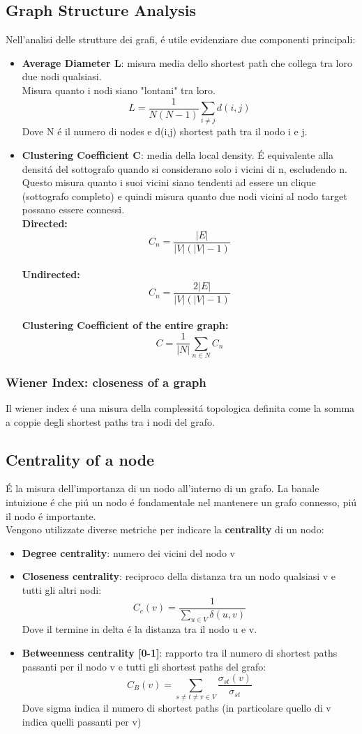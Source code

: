 \subsection{Graph Structure Analysis}
Nell'analisi delle strutture dei grafi, é utile evidenziare due componenti principali:
\begin{itemize}
    \item \textbf{Average Diameter L}: misura media dello shortest path che collega tra loro due nodi qualsiasi.
    \\
    Misura quanto i nodi siano "lontani" tra loro. 
    \[
    L =\frac{1}{N(N-1)} \sum_{i \neq j} d(i,j)
    \]
    Dove N é il numero di nodes e d(i,j) shortest path tra il nodo i e j.
    \item \textbf{Clustering Coefficient C}: media della local density.
    É equivalente alla densitá del sottografo quando si considerano solo i vicini di n, escludendo n. Questo misura quanto i suoi vicini siano tendenti ad essere un clique (sottografo completo) e quindi misura quanto due nodi vicini al nodo target possano essere connessi.
    \\[2ex]
    \textbf{Directed:}\[
    C_n = \frac{|E|}{|V|(|V|-1)}
    \]
    \\
    \textbf{Undirected:}\[
    C_n = \frac{2|E|}{|V|(|V|-1)}
    \]    
    \\
    \textbf{Clustering Coefficient of the entire graph:}
    \[
    C = \frac{1}{|N|}\sum_{n \in N}C_n
    \]
\end{itemize}

\subsubsection*{Wiener Index: closeness of a graph}
Il wiener index é una misura della complessitá topologica definita come la somma a coppie degli shortest paths tra i nodi del grafo. 
\newpage
\subsection{Centrality of a node}
É la misura dell'importanza di un nodo all'interno di un grafo. La banale intuizione é che piú un nodo é fondamentale nel mantenere un grafo connesso, piú il nodo é importante. 
\\
Vengono utilizzate diverse metriche per indicare la \textbf{centrality} di un nodo:
\begin{itemize}
    \item \textbf{Degree centrality}: numero dei vicini del nodo v 
    \item \textbf{Closeness centrality}: reciproco della distanza tra un nodo qualsiasi v e tutti gli altri nodi:
    \[
    C_c (v)=\frac{1}{\sum_{u \in V} \delta (u,v)}
    \]
    Dove il termine in delta é la distanza tra il nodo u e v.
    \item \textbf{Betweenness centrality [0-1]}: rapporto tra il numero di shortest paths passanti per il nodo v e tutti gli shortest paths del grafo:
    \[
    C_B(v)=\sum_{s\neq t \neq v \in V} \frac{\sigma_{st}(v)}{\sigma_{st}}
    \]
    Dove sigma indica il numero di shortest paths (in particolare quello di v indica quelli passanti per v)
\end{itemize}

